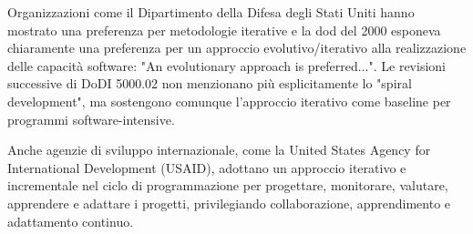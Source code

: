Organizzazioni come il Dipartimento della Difesa degli Stati Uniti hanno mostrato una preferenza per metodologie iterative e la \gls{dod} del 2000 esponeva chiaramente una preferenza per un approccio evolutivo/iterativo alla realizzazione delle capacità software: "An evolutionary approach is preferred...". Le revisioni successive di DoDI 5000.02 non menzionano più esplicitamente lo "spiral development", ma sostengono comunque l'approccio iterativo come baseline per programmi software-intensive.

Anche agenzie di sviluppo internazionale, come la United States Agency for International Development (USAID), adottano un approccio iterativo e incrementale nel ciclo di programmazione per progettare, monitorare, valutare, apprendere e adattare i progetti, privilegiando collaborazione, apprendimento e adattamento continuo.


